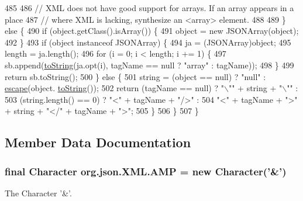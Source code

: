 \begin{DoxyCode}
485 
486 \textcolor{comment}{// XML does not have good support for arrays. If an array appears in a place}
487 \textcolor{comment}{// where XML is lacking, synthesize an <array> element.}
488 
489         \} \textcolor{keywordflow}{else} \{
490             \textcolor{keywordflow}{if} (\textcolor{keywordtype}{object}.getClass().isArray()) \{
491                 \textcolor{keywordtype}{object} = \textcolor{keyword}{new} JSONArray(\textcolor{keywordtype}{object});
492             \}
493             \textcolor{keywordflow}{if} (\textcolor{keywordtype}{object} instanceof JSONArray) \{
494                 ja = (JSONArray)\textcolor{keywordtype}{object};
495                 length = ja.length();
496                 \textcolor{keywordflow}{for} (i = 0; i < length; i += 1) \{
497                     sb.append(\hyperlink{classorg_1_1json_1_1_x_m_l_a4d4cd79a68a991f50707b87a7a23d02b}{toString}(ja.opt(i), tagName == null ? \textcolor{stringliteral}{"array"} : tagName));
498                 \}
499                 \textcolor{keywordflow}{return} sb.toString();
500             \} \textcolor{keywordflow}{else} \{
501                 \textcolor{keywordtype}{string} = (\textcolor{keywordtype}{object} == null) ? \textcolor{stringliteral}{"null"} : \hyperlink{classorg_1_1json_1_1_x_m_l_ac7d1541b807c9c09526495fa16ab0d75}{escape}(\textcolor{keywordtype}{object}.
      \hyperlink{classorg_1_1json_1_1_x_m_l_a4d4cd79a68a991f50707b87a7a23d02b}{toString}());
502                 \textcolor{keywordflow}{return} (tagName == null) ? \textcolor{stringliteral}{"\(\backslash\)""} + \textcolor{keywordtype}{string} + \textcolor{stringliteral}{"\(\backslash\)""} :
503                     (\textcolor{keywordtype}{string}.length() == 0) ? \textcolor{stringliteral}{"<"} + tagName + \textcolor{stringliteral}{"/>"} :
504                     \textcolor{stringliteral}{"<"} + tagName + \textcolor{stringliteral}{">"} + \textcolor{keywordtype}{string} + \textcolor{stringliteral}{"</"} + tagName + \textcolor{stringliteral}{">"};
505             \}
506         \}
507     \}
\end{DoxyCode}


\subsection{Member Data Documentation}
\hypertarget{classorg_1_1json_1_1_x_m_l_a2ed9b74a6dcc1a3833460cb35b72a8e2}{
\subsubsection[{A\-M\-P}]{\setlength{\rightskip}{0pt plus 5cm}final Character org.\-json.\-X\-M\-L.\-A\-M\-P = new Character('\&')\hspace{0.3cm}{\ttfamily [static]}}}\label{classorg_1_1json_1_1_x_m_l_a2ed9b74a6dcc1a3833460cb35b72a8e2}
The Character '\&'. 

